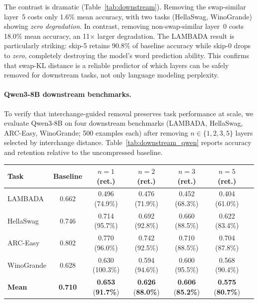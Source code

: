 \documentclass{article}
\newenvironment{tabhere}{%
  \par\medskip
  \begin{center}
}{%
  \end{center}
  \medskip
}
\begin{document}
The contrast is dramatic (Table~\ref{tab:downstream}). Removing the swap-similar layer~5 costs only 1.6\% mean accuracy, with two tasks (HellaSwag, WinoGrande) showing \emph{zero degradation}. In contrast, removing non-swap-similar layer~0 costs 18.0\% mean accuracy, an 11$\times$ larger degradation. The LAMBADA result is particularly striking: skip-5 retains 90.8\% of baseline accuracy while skip-0 drops to \emph{zero}, completely destroying the model's word prediction ability. This confirms that swap-KL distance is a reliable predictor of which layers can be safely removed for downstream tasks, not only language modeling perplexity.

\paragraph{Qwen3-8B downstream benchmarks.}
To verify that interchange-guided removal preserves task performance at scale, we evaluate Qwen3-8B on four downstream benchmarks (LAMBADA, HellaSwag, ARC-Easy, WinoGrande; 500 examples each) after removing $n \in \{1,2,3,5\}$ layers selected by interchange distance. Table~\ref{tab:downstream_qwen} reports accuracy and retention relative to the uncompressed baseline.

\begin{tabhere}
\begin{tabular}{lcccccc}
\toprule
Task & Baseline & $n{=}1$ (ret.) & $n{=}2$ (ret.) & $n{=}3$ (ret.) & $n{=}5$ (ret.) \\
\midrule
LAMBADA & 0.662 & 0.496 (74.9\%) & 0.476 (71.9\%) & 0.452 (68.3\%) & 0.404 (61.0\%) \\
HellaSwag & 0.746 & 0.714 (95.7\%) & 0.692 (92.8\%) & 0.660 (88.5\%) & 0.622 (83.4\%) \\
ARC-Easy & 0.802 & 0.770 (96.0\%) & 0.742 (92.5\%) & 0.710 (88.5\%) & 0.704 (87.8\%) \\
WinoGrande & 0.628 & 0.630 (100.3\%) & 0.594 (94.6\%) & 0.600 (95.5\%) & 0.568 (90.4\%) \\
\midrule
\textbf{Mean} & \textbf{0.710} & \textbf{0.653} (\textbf{91.7\%}) & \textbf{0.626} (\textbf{88.0\%}) & \textbf{0.606} (\textbf{85.2\%}) & \textbf{0.575} (\textbf{80.7\%}) \\
\bottomrule
\end{tabular}
\label{tab:downstream_qwen}
\end{tabhere}
\end{document}
